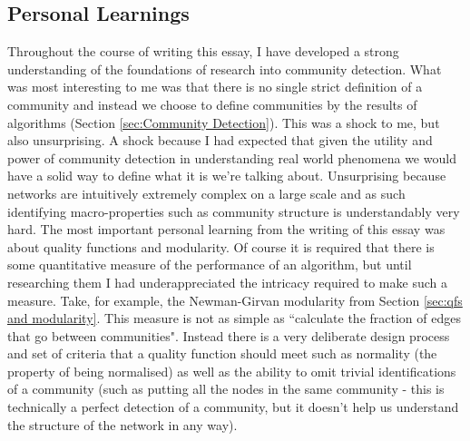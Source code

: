 \subsection{Personal Learnings}
Throughout the course of writing this essay, I have developed a strong understanding of the foundations of research into community detection. What was most interesting to me was that there is no single strict definition of a community and instead we choose to define communities by the results of algorithms (Section \ref{sec:Community Detection}). This was a shock to me, but also unsurprising. A shock because I had expected that given the utility and power of community detection in understanding real world phenomena we would have a solid way to define what it is we're talking about. Unsurprising because networks are intuitively extremely complex on a large scale and as such identifying macro-properties such as community structure is understandably very hard. The most important personal learning from the writing of this essay was about quality functions and modularity. Of course it is required that there is some quantitative measure of the performance of an algorithm, but until researching them I had underappreciated the intricacy required to make such a measure. Take, for example, the Newman-Girvan modularity from Section \ref{sec:qfs and modularity}. This measure is not as simple as ``calculate the fraction of edges that go between communities". Instead there is a very deliberate design process and set of criteria that a quality function should meet such as normality (the property of being normalised) as well as the ability to omit trivial identifications of a community (such as putting all the nodes in the same community - this is technically a perfect detection of a community, but it doesn't help us understand the structure of the network in any way).

